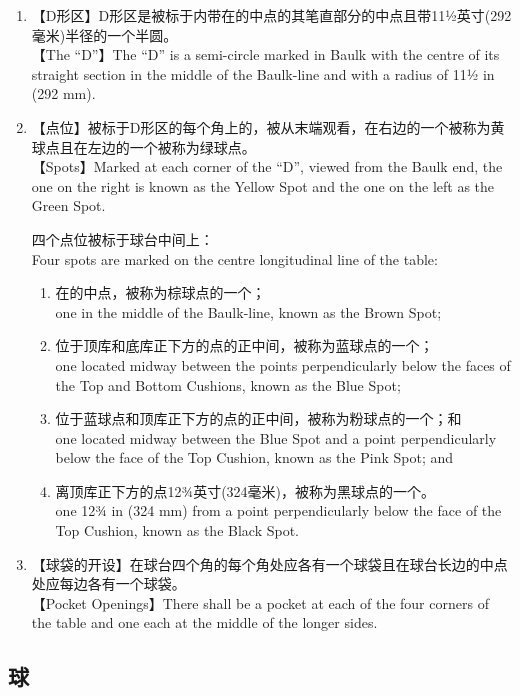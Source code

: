 \begin{enumerate}[label=(\alph*)]
    \item 【D形区】D形区是被标于\baulk{}内带在\baulkline{}的中点的其笔直部分的中点且带11½英寸(292毫米)半径的一个半圆。\\
    【The ``D''】The ``D'' is a semi-circle marked in Baulk with the centre of its straight section in the middle of the Baulk-line and with a radius of 11½ in (292 mm).
    \item \label{2211f}【点位】被标于D形区的每个角上的，被从\baulk{}末端观看，在右边的一个被称为黄球点且在左边的一个被称为绿球点。\\
    【Spots】Marked at each corner of the ``D'', viewed from the Baulk end, the one on the right is known as the Yellow Spot and the one on the left as the Green Spot.

    四个点位被标于球台中间\longitudinalline{}上：\\
    Four spots are marked on the centre longitudinal line of the table:
    \begin{enumerate}[label=(\roman*)]
        \item 在\baulkline{}的中点，被称为棕球点的一个；\\
        one in the middle of the Baulk-line, known as the Brown Spot;
        \item 位于顶库\face{}和底库\face{}正下方的点的正中间，被称为蓝球点的一个；\\
        one located midway between the points perpendicularly below the faces of the Top and Bottom Cushions, known as the Blue Spot;
        \item 位于蓝球点和顶库\face{}正下方的点的正中间，被称为粉球点的一个；和\\
        one located midway between the Blue Spot and a point perpendicularly below the face of the Top Cushion, known as the Pink Spot; and
        \item 离顶库\face{}正下方的点12¾英寸(324毫米)，被称为黑球点的一个。\\
        one 12¾ in (324 mm) from a point perpendicularly below the face of the Top Cushion, known as the Black Spot.
    \end{enumerate}
    \item【球袋的开设】在球台四个角的每个角处应各有一个球袋且在球台长边的中点处应每边各有一个球袋。\\
    【Pocket Openings】There shall be a pocket at each of the four corners of the table and one each at the middle of the longer sides.
\end{enumerate}

\subsection{球}

